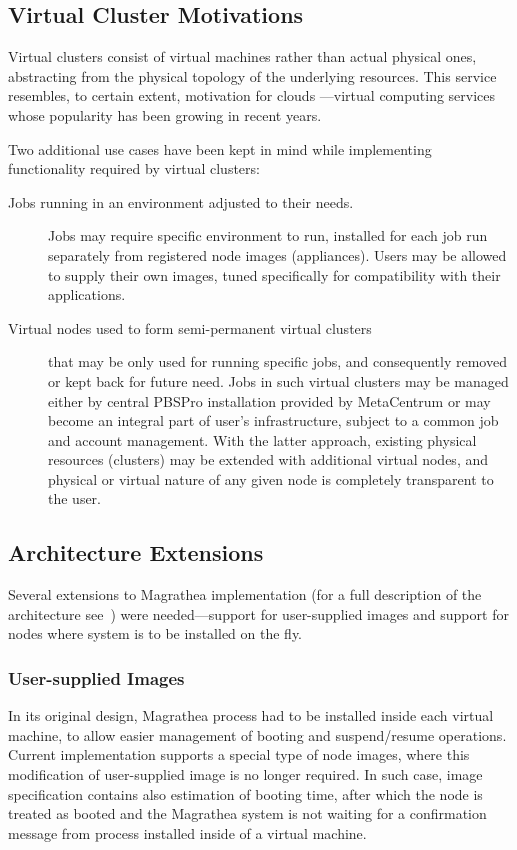 \documentclass[a4paper]{article}
\begin{document}
\subsection{Virtual Cluster Motivations}
Virtual clusters consist of virtual machines rather than actual physical ones,
abstracting from the physical topology of the underlying resources. This service
resembles, to certain extent, motivation for clouds ---virtual computing services
whose popularity has been growing in recent years.

Two additional use cases have been kept in mind while implementing functionality
required by virtual clusters:

\begin{description}

\item[Jobs running in an environment adjusted to their needs.] 
Jobs may require specific environment to run, installed for each job run separately 
from registered node images (appliances). Users may be allowed to
supply their own images, tuned specifically for compatibility with their applications.

\item[Virtual nodes used to form semi-permanent
virtual clusters] that may be only used for running specific
jobs, and consequently removed or kept back for future need. Jobs in such virtual
clusters may be managed either by central PBSPro installation provided by MetaCentrum
or may become an integral part of user's infrastructure,
subject to a common job and account management. With the latter approach, existing 
physical resources (clusters) may be
extended with additional virtual nodes, and physical or virtual nature of any given
node is completely transparent to the user.
\end{description}

\subsection{Architecture Extensions}

Several extensions to Magrathea implementation (for a full description of the architecture see~\cite{sc07})
were needed---support for user-supplied images and support for nodes where system is to be installed on the fly.

\subsubsection{User-supplied Images}
In its original design, Magrathea process had to be installed inside each virtual machine, to allow 
easier management of booting and suspend/resume operations. Current implementation supports a special type 
of node images, where this modification of user-supplied image is no longer required. In such case, image 
specification contains also estimation of booting time, after which the
node is treated as booted and the Magrathea system 
is not waiting for a confirmation message from process installed inside of
a virtual machine.
\end{document}
